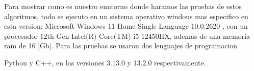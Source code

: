 \begin{mdframed}
    Para mostrar como es nuestro enntorno donde haramos las pruebas de estos algoritmos, todo se
    ejecuto en un sistema operativo windous mas especifico en esta version: Microsoft Windows 11 
    Home Single Language 10.0.2620 , con un procesador 12th Gen Intel(R) Core(TM) i5-12450HX, 
    ademas de una memoria ram de 16 [Gb]. Para las pruebas se usaron dos lenguajes de programacion 
    
    Python y C++, en las versiones 3.13.0 y 13.2.0 respectivamente.
    \\
    \\
\end{mdframed}